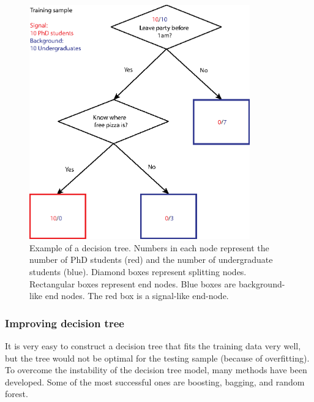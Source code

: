 \begin{figure}[!htbp]
\includegraphics[width=0.85\textwidth]{doubleHiggs/mva/BDTcomic}
\caption[Example of a decision tree. ]
{Example of a decision tree. Numbers in each node represent the number of PhD students (red) and the number of undergraduate students (blue). Diamond boxes represent splitting nodes. Rectangular boxes represent end nodes. Blue boxes are background-like end nodes. The red box is a signal-like end-node.}
   \label{fig:doubleHiggsMVAdecisionTree}
\end{figure}

\subsubsection{Improving decision tree}



It is very easy to construct a decision tree that fits the training data very well, but the tree would not be optimal for the testing sample (because of overfitting). To overcome the instability of the decision tree model, many methods have been developed. Some of the most successful ones are boosting, bagging, and random forest.

